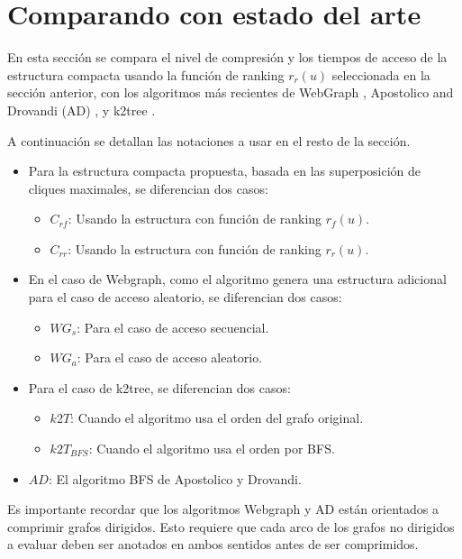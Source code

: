 \section{Comparando con estado del arte}
En esta sección se compara el nivel de compresión y los tiempos de acceso de la estructura compacta usando la función de ranking $r_{r}(u)$ seleccionada en la sección anterior, con los algoritmos más recientes de WebGraph \cite{boldi2011layered}, Apostolico and Drovandi (AD) \cite{apostolico2009graph}, y k2tree \cite{brisaboa2009k, brisaboa2014compact}.

A continuación se detallan las notaciones a usar en el resto de la sección.

\begin{itemize}
	\item Para la estructura compacta propuesta, basada en las superposición de cliques maximales, se diferencian dos casos:
		\begin{itemize}
			\item $C_{rf}$: Usando la estructura con función de ranking $r_{f}(u)$.
			\item $C_{rr}$: Usando la estructura con función de ranking $r_{r}(u)$.
		\end{itemize}			
	\item En el caso de Webgraph, como el algoritmo genera una estructura adicional para el caso de acceso aleatorio, se diferencian dos casos: 
		\begin{itemize}
			\item $WG_{s}$: Para el caso de acceso secuencial. 
			\item $WG_{a}$: Para el caso de acceso aleatorio.
		\end{itemize}
	\item Para el caso de k2tree, se diferencian dos casos:
		\begin{itemize}
			\item $k2T$: Cuando el algoritmo usa el orden del grafo original.
			\item $k2T_{BFS}$: Cuando el algoritmo usa el orden por BFS.
		\end{itemize}			
	\item $AD$: El algoritmo BFS de Apostolico y Drovandi.
\end{itemize}

Es importante recordar que los algoritmos Webgraph y AD están orientados a comprimir grafos dirigidos. Esto requiere que cada arco de los grafos no dirigidos a evaluar deben ser anotados en ambos sentidos antes de ser comprimidos. 


